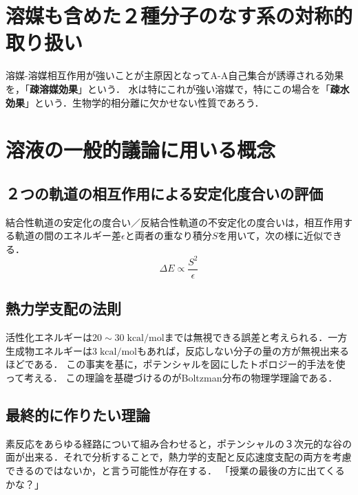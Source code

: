 \documentclass[uplatex, dvipdfmx]{jsreport}
\begin{document}
\section{溶媒も含めた２種分子のなす系の対称的取り扱い}

溶媒-溶媒相互作用が強いことが主原因となってA-A自己集合が誘導される効果を，「\textbf{疎溶媒効果}」という．
水は特にこれが強い溶媒で，特にこの場合を「\textbf{疎水効果}」という．生物学的相分離に欠かせない性質であろう．

\section{溶液の一般的議論に用いる概念}

\subsection{２つの軌道の相互作用による安定化度合いの評価}
結合性軌道の安定化の度合い／反結合性軌道の不安定化の度合いは，相互作用する軌道の間のエネルギー差$\epsilon$と両者の重なり積分$S$を用いて，次の様に近似できる．
\[ \Delta E \propto \frac{S^2}{\epsilon} \]

\subsection{熱力学支配の法則}

活性化エネルギーは$20\sim 30\;\mathrm{kcal/mol}$までは無視できる誤差と考えられる．一方生成物エネルギーは$3\;\mathrm{kcal/mol}$もあれば，反応しない分子の量の方が無視出来るほどである．
この事実を基に，ポテンシャルを図にしたトポロジー的手法を使って考える．
この理論を基礎づけるのがBoltzman分布の物理学理論である．

\subsection{最終的に作りたい理論}

素反応をあらゆる経路について組み合わせると，ポテンシャルの３次元的な谷の面が出来る．それで分析することで，熱力学的支配と反応速度支配の両方を考慮できるのではないか，と言う可能性が存在する．
「授業の最後の方に出てくるかな？」
\end{document}
